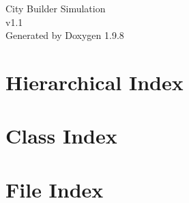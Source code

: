 \documentclass[twoside]{book}
\newcommand{\+}{\discretionary{\mbox{\scriptsize$\hookleftarrow$}}{}{}}
\newcommand{\clearemptydoublepage}{%
    \newpage{\pagestyle{empty}\cleardoublepage}%
  }
\begin{document}
  \raggedbottom
    \hypersetup{pageanchor=false,
                bookmarksnumbered=true,
                pdfencoding=unicode
               }
  \begin{titlepage}
  \vspace*{7cm}
  \begin{center}%
  {\Large City Builder Simulation}\\
  [1ex]\large v1.\+1 \\
  \vspace*{1cm}
  {\large Generated by Doxygen 1.9.8}\\
  \end{center}
  \end{titlepage}
  \clearemptydoublepage
  \tableofcontents
  \clearemptydoublepage
  \hypersetup{pageanchor=true}

\chapter{Hierarchical Index}

\chapter{Class Index}

\chapter{File Index}

\end{document}

